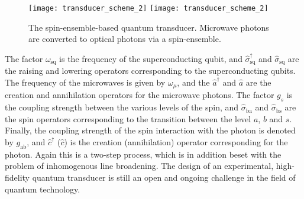 \begin{figure}[!htbp]
\pubmode
\texttt{[image: transducer\_scheme\_2]}
\else
\texttt{[image: transducer\_scheme\_2]}
\fi
\caption{The spin-ensemble-based quantum transducer. Microwave photons are converted to optical photons via a spin-ensemble.}\label{fig:spin_ens_transducer}
\end{figure}

The factor $\omega_\mathrm{sq}$ is the frequency of the superconducting qubit, and $\hat\sigma_\mathrm{sq}^{\dag}$ and $\hat\sigma_\mathrm{sq}$ are the raising and lowering operators corresponding to the superconducting qubits. The frequency of the microwaves is given by $\omega_{\mu}$, and the $\hat{a}^{\dag}$ and $\hat{a}$ are the creation and annihilation operators for the microwave photons. The factor $g_{s}$ is the coupling strength between the various levels of the spin, and $\hat\sigma_\mathrm{ba}$ and $\hat\sigma_\mathrm{bs}$ are the spin operators corresponding to the transition between the level $a$, $b$ and $s$. Finally, the coupling strength of the spin interaction with the photon is denoted by $g_\mathrm{ab}$, and $\hat{c}^{\dag}$ ($\hat{c}$) is the creation (annihilation) operator corresponding for the photon. Again this is a two-step process, which is in addition beset with the problem of inhomogenous line broadening. The design of an experimental, high-fidelity quantum transducer is still an open and ongoing challenge in the field of quantum technology.